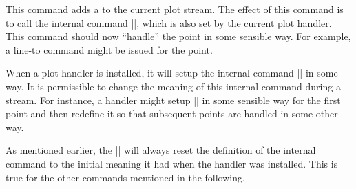 \begin{command}{\pgfplotstreampoint{}}
    This command adds a  to the current plot stream. The effect of
    this command is to call the internal command |\pgf@plotstreampoint|, which
    is also set by the current plot handler. This command should now ``handle''
    the point in some sensible way. For example, a line-to command might be
    issued for the point.

    When a plot handler is installed, it will setup the internal command
    |\pgf@plotstreampoint| in some way. It is permissible to change the meaning
    of this internal command during a stream. For instance, a handler might
    setup |\pgf@plotstreampoint| in some sensible way for the first point and
    then redefine it so that subsequent points are handled in some other way.

    As mentioned earlier, the |\pgfplotstreamstart| will always reset the
    definition of the internal command to the initial meaning it had when the
    handler was installed. This is true for the other commands mentioned in the
    following.
\end{command}

